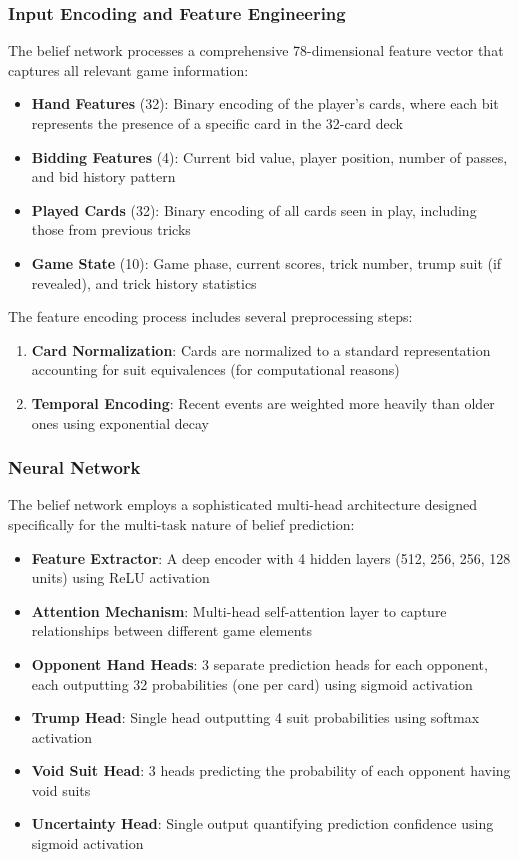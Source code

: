 \documentclass[conference]{IEEEtran}
\begin{document}
\subsubsection{Input Encoding and Feature Engineering}

The belief network processes a comprehensive 78-dimensional feature vector that captures all relevant game information:

\begin{itemize}
    \item \textbf{Hand Features} (32): Binary encoding of the player's cards, where each bit represents the presence of a specific card in the 32-card deck
    \item \textbf{Bidding Features} (4): Current bid value, player position, number of passes, and bid history pattern
    \item \textbf{Played Cards} (32): Binary encoding of all cards seen in play, including those from previous tricks
    \item \textbf{Game State} (10): Game phase, current scores, trick number, trump suit (if revealed), and trick history statistics
\end{itemize}


The feature encoding process includes several preprocessing steps:

\begin{enumerate}
    \item \textbf{Card Normalization}: Cards are normalized to a standard representation accounting for suit equivalences (for computational reasons)
    \item \textbf{Temporal Encoding}: Recent events are weighted more heavily than older ones using exponential decay
\end{enumerate}

\subsubsection{Neural Network}
The belief network employs a sophisticated multi-head architecture designed specifically for the multi-task nature of belief prediction:

\begin{itemize}
    \item \textbf{Feature Extractor}: A deep encoder with 4 hidden layers (512, 256, 256, 128 units) using ReLU activation
    \item \textbf{Attention Mechanism}: Multi-head self-attention layer to capture relationships between different game elements
    \item \textbf{Opponent Hand Heads}: 3 separate prediction heads for each opponent, each outputting 32 probabilities (one per card) using sigmoid activation
    \item \textbf{Trump Head}: Single head outputting 4 suit probabilities using softmax activation
    \item \textbf{Void Suit Head}: 3 heads predicting the probability of each opponent having void suits
    \item \textbf{Uncertainty Head}: Single output quantifying prediction confidence using sigmoid activation
\end{itemize}
\end{document}
